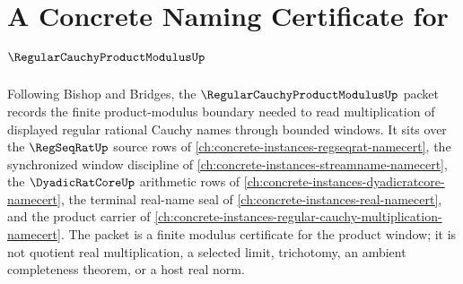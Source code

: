 \chapter{A Concrete Naming Certificate for $\RegularCauchyProductModulusUp$}
\label{ch:concrete-instances-regular-cauchy-product-modulus-namecert}

Following Bishop and Bridges, the $\RegularCauchyProductModulusUp$ packet records the finite product-modulus boundary needed to read multiplication of displayed regular rational Cauchy names through bounded windows. It sits over the $\RegSeqRatUp$ source rows of \autoref{ch:concrete-instances-regseqrat-namecert}, the synchronized window discipline of \autoref{ch:concrete-instances-streamname-namecert}, the $\DyadicRatCoreUp$ arithmetic rows of \autoref{ch:concrete-instances-dyadicratcore-namecert}, the terminal real-name seal of \autoref{ch:concrete-instances-real-namecert}, and the product carrier of \autoref{ch:concrete-instances-regular-cauchy-multiplication-namecert}. The packet is a finite modulus certificate for the product window; it is not quotient real multiplication, a selected limit, trichotomy, an ambient completeness theorem, or a host real norm.

